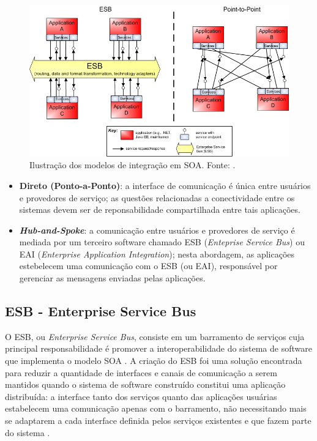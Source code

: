 \begin{figure}[htb]
\centering
\includegraphics[scale=0.7]{figuras/modelos_integracao_soa.png}
\caption{Ilustração dos modelos de integração em SOA. Fonte: \cite{Bianco2007}.}
\label{modelos_integracao_soa}
\end{figure}

\begin{itemize}
\item \textbf{Direto (Ponto-a-Ponto)}: a interface de comunicação é única entre usuários e provedores de serviço; as questões relacionadas a conectividade entre os sistemas devem ser de reponsabilidade compartilhada entre tais aplicações.
\item \textbf{\textit{Hub-and-Spoke}}: a comunicação entre usuários e provedores de serviço é mediada por um terceiro software chamado ESB (\textit{Enteprise Service Bus}) ou EAI (\textit{Enterprise Application Integration}); nesta abordagem, as aplicações estebelecem uma comunicação com o ESB (ou EAI), responsável por gerenciar as mensagens enviadas pelas aplicações.
\end{itemize}

\subsection{ESB - Enterprise Service Bus}

O ESB, ou \textit{Enterprise Service Bus}, consiste em um barramento de serviços cuja principal responsabilidade é promover a interoperabilidade do sistema de software que implementa o modelo SOA \cite{josuttis_soa_2007}. A criação do ESB foi uma solução encontrada para reduzir a quantidade de interfaces e canais de comunicação a serem mantidos quando o sistema de software construído constitui uma aplicação distribuída: a interface tanto dos serviços quanto das aplicações usuárias estabelecem uma comunicação apenas com o barramento, não necessitando mais se adaptarem a cada interface definida pelos serviços existentes e que fazem parte do sistema \cite{josuttis_soa_2007}.

